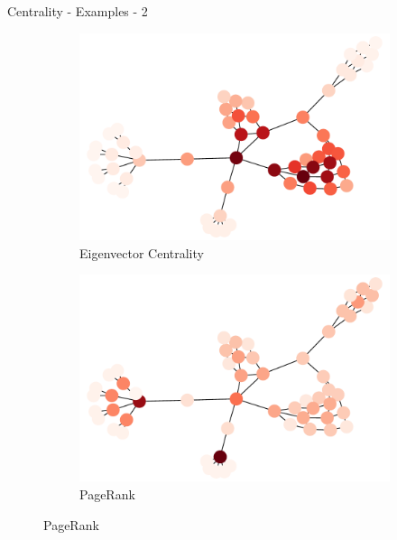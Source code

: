 \documentclass[a4paper,11pt]{book}
\begin{document}
\begin{textbox}{Centrality - Examples - 2}
\begin{figure}[H]
\begin{subfigure}{.5\textwidth}
\includegraphics[width=\textwidth]{pics/exampleEigenvector.pdf}
    \caption{Eigenvector Centrality}
\end{subfigure}
\begin{subfigure}{.5\textwidth}
\includegraphics[width=\textwidth]{pics/examplepagerank.pdf}
    \caption{PageRank}
\end{subfigure}



\end{figure}


\end{textbox}
\end{document}
